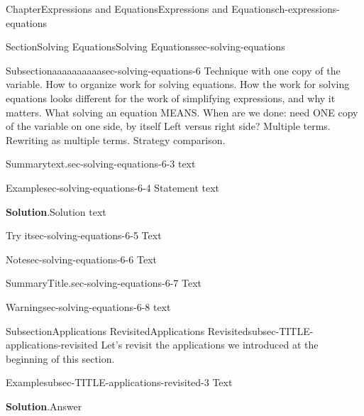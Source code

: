 \documentclass[twoside,11pt,]{book}
\newcommand{\blocktitlefont}{\relax}
\numberwithin{equation}{chapter}
\begin{document}
\begin{chapterptx}{Chapter}{Expressions and Equations}{}{Expressions and Equations}{}{}{ch-expressions-equations}
\begin{sectionptx}{Section}{Solving Equations}{}{Solving Equations}{}{}{sec-solving-equations}
\typeout{************************************************}
%
\begin{subsectionptx}{Subsection}{aaaaa}{}{aaaaa}{}{}{sec-solving-equations-6}
Technique with one copy of the variable. How to organize work for solving equations. How the work for solving equations looks different for the work of simplifying expressions, and why it matters. What solving an equation MEANS. When are we done: need ONE copy of the variable on one side, by itself Left versus right side? Multiple terms. Rewriting as multiple terms. Strategy comparison.%
\begin{assemblage}{Summary}{text.}{sec-solving-equations-6-3}%
text%
\end{assemblage}
\begin{example}{Example}{}{sec-solving-equations-6-4}%
Statement text%
\par\smallskip%
\noindent\textbf{\blocktitlefont Solution}.\hypertarget{sec-solving-equations-6-4-2}{}\quad{}Solution text%
\end{example}
\begin{inlineexercise}{Try it}{}{sec-solving-equations-6-5}%
Text%
\end{inlineexercise}%
\begin{note}{Note}{}{sec-solving-equations-6-6}%
Text%
\end{note}
\begin{assemblage}{Summary}{Title.}{sec-solving-equations-6-7}%
Text%
\end{assemblage}
\begin{warning}{Warning}{}{sec-solving-equations-6-8}%
text%
\end{warning}
\end{subsectionptx}
%
%
\typeout{************************************************}
\typeout{************************************************}
%
\begin{subsectionptx}{Subsection}{Applications Revisited}{}{Applications Revisited}{}{}{subsec-TITLE-applications-revisited}
Let's revisit the applications we introduced at the beginning of this section.%
\begin{example}{Example}{}{subsec-TITLE-applications-revisited-3}%
Text%
\par\smallskip%
\noindent\textbf{\blocktitlefont Solution}.\hypertarget{subsec-TITLE-applications-revisited-3-2}{}\quad{}Answer%
\end{example}
\end{subsectionptx}
%
%
\typeout{************************************************}

\end{sectionptx}
\end{chapterptx}
\end{document}
